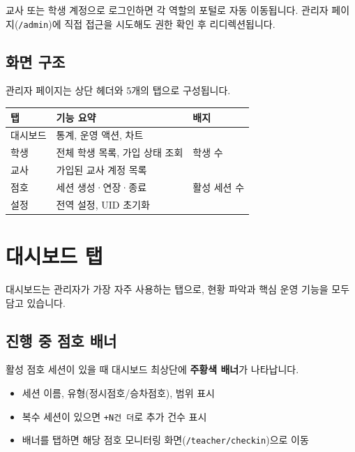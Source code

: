 \documentclass[a4paper,11pt]{article}
\begin{document}
\begin{tcolorbox}[warnbox]
교사 또는 학생 계정으로 로그인하면 각 역할의 포털로 자동 이동됩니다.
관리자 페이지(\texttt{/admin})에 직접 접근을 시도해도 권한 확인 후 리디렉션됩니다.
\end{tcolorbox}

\subsection{화면 구조}

관리자 페이지는 상단 헤더와 5개의 탭으로 구성됩니다.

\begin{center}
\begin{tabular}{@{}lll@{}}
  \toprule
  \textbf{탭} & \textbf{기능 요약} & \textbf{배지} \\
  \midrule
  대시보드 & 통계, 운영 액션, 차트 & \\
  학생 & 전체 학생 목록, 가입 상태 조회 & 학생 수 \\
  교사 & 가입된 교사 계정 목록 & \\
  점호 & 세션 생성·연장·종료 & 활성 세션 수 \\
  설정 & 전역 설정, UID 초기화 & \\
  \bottomrule
\end{tabular}
\end{center}

\section{대시보드 탭}

대시보드는 관리자가 가장 자주 사용하는 탭으로, 현황 파악과 핵심 운영 기능을 모두 담고 있습니다.

\subsection{진행 중 점호 배너}

활성 점호 세션이 있을 때 대시보드 최상단에 \textbf{주황색 배너}가 나타납니다.

\begin{itemize}
  \item 세션 이름, 유형(정시점호/승차점호), 범위 표시
  \item 복수 세션이 있으면 \texttt{+N건 더}로 추가 건수 표시
  \item 배너를 탭하면 해당 점호 모니터링 화면(\texttt{/teacher/checkin})으로 이동
\end{itemize}
\end{document}
